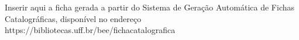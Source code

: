 
%
%
\begin{fichacatalografica}
\begin{center}Inserir aqui a ficha gerada a partir do Sistema de Geração Automática de Fichas Catalográficas, disponível no endereço
https://bibliotecas.uff.br/bee/fichacatalografica
\end{center}
\end{fichacatalografica}

